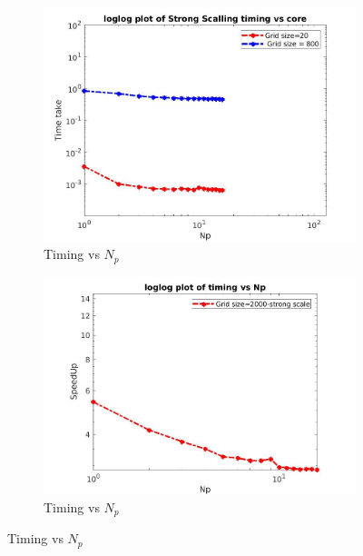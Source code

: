 \documentclass{article}
\begin{document}
\begin{figure}[t!] %
\begin{subfigure}{0.48\textwidth}
\includegraphics[width=\linewidth]{timing-strongscaling.jpeg}
\caption{Timing vs $N_p$} \label{fig:a}
\end{subfigure}\hspace*{\fill}
\begin{subfigure}{0.48\textwidth}
\includegraphics[width=\linewidth]{timing2000.jpeg}
\caption{Timing vs $N_p$} \label{fig:b}
\end{subfigure}


\end{figure}
\end{document}
